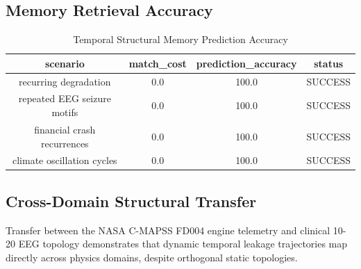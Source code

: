 \documentclass{article}
\begin{document}
\subsection{Memory Retrieval Accuracy}
\begin{table}[h]
\centering
\begin{tabular}{|c|c|c|c|}
\hline
scenario & match\_cost & prediction\_accuracy & status \\
\hline
recurring degradation & 0.0 & 100.0 & SUCCESS \\
repeated EEG seizure motifs & 0.0 & 100.0 & SUCCESS \\
financial crash recurrences & 0.0 & 100.0 & SUCCESS \\
climate oscillation cycles & 0.0 & 100.0 & SUCCESS \\
\hline
\end{tabular}
\caption{Temporal Structural Memory Prediction Accuracy}
\label{tab:memory}
\end{table}


\subsection{Cross-Domain Structural Transfer}
Transfer between the NASA C-MAPSS FD004 engine telemetry and clinical 10-20 EEG topology demonstrates that dynamic temporal leakage trajectories map directly across physics domains, despite orthogonal static topologies.
\end{document}
